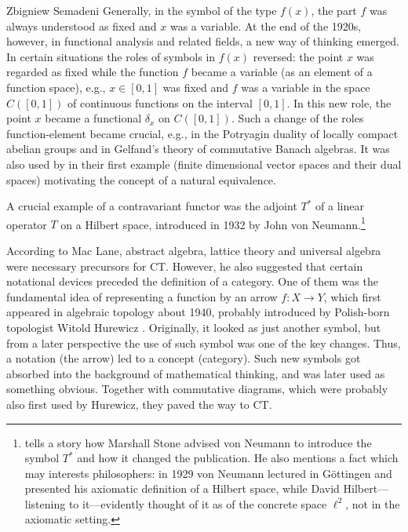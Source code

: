 \begin{artengenv}{Zbigniew Semadeni}
Generally, in the symbol of the type $f(x)$, the part $f$ was always understood 
as fixed and $x$ was a variable. At the end of the 1920s, however, in functional 
analysis and related fields, a new way of thinking emerged. In certain situations 
the roles of symbols in $f(x)$ reversed: the point $x$ was regarded as fixed while 
the function $f$ became a variable (as an element of a function space), e.g., 
$x\in [0,1]$ was fixed and $f$ was a variable in the space $C([0,1])$ of continuous 
functions on the interval $[0,1]$. In this new role, the point $x$ became a functional 
$\delta_x$ on $C([0,1])$. Such a change of the roles function-element became crucial, 
e.g., in the Potryagin duality of locally compact abelian groups \parencite{Hewitt} 
and in Gelfand’s theory of commutative Banach algebras. It was also used by \citeauthor{E-ML} 
in their first example (finite dimensional vector spaces 
and their dual spaces) motivating the concept of a natural equivalence.  

A crucial example of a contravariant functor was the adjoint $T^\ast$ of a linear 
operator $T$ on a Hilbert space, introduced in 1932 by John von Neumann.\footnote{\citeauthor[p.330]{Century} tells a story how Marshall Stone advised von Neumann to introduce the symbol $T^\ast$ and how it changed the publication. He also 
mentions a fact which may interests philosophers: in 1929 von Neumann lectured in 
G{\"o}ttingen and presented his axiomatic definition of a Hilbert space, while David 
Hilbert---listening to it---evidently thought of it as of the concrete 
space $\ell^2$, not in the axiomatic setting.} %

According to Mac Lane, abstract algebra, lattice theory and universal algebra were 
necessary precursors for CT. However, he also suggested that certain notational 
devices preceded the definition of a category. One of them was the fundamental idea 
of representing a function by an arrow $f\colon X\to Y$, which first appeared in 
algebraic topology about 1940, probably introduced by Polish-born topologist Witold 
Hurewicz \parencites[][p.29]{Working}[][p.333]{Century}. Originally, it looked as just 
another symbol, but from a later perspective the use of such symbol was one of the 
key changes. Thus, a notation (the arrow) led to a concept (category). Such new symbols 
got absorbed into the background of mathematical thinking, and was later used as something 
obvious. Together with commutative diagrams, which were probably also first used by 
Hurewicz, they paved the way to CT. 


\end{artengenv}
